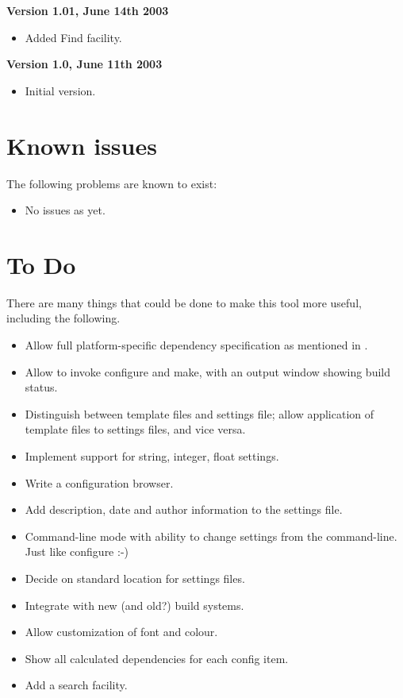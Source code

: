 {\bf Version 1.01, June 14th 2003}

\begin{itemize}\itemsep=10pt
\item Added Find facility.
\end{itemize}

{\bf Version 1.0, June 11th 2003}

\begin{itemize}\itemsep=10pt
\item Initial version.
\end{itemize}

\section{Known issues}\label{knownissues}

The following problems are known to exist:

\begin{itemize}\itemsep=10pt
\item No issues as yet.
\end{itemize}

\section{To Do}\label{todo}

There are many things that could be done to make
this tool more useful, including the following.

\begin{itemize}\itemsep=10pt
\item Allow full platform-specific dependency specification
as mentioned in .
\item Allow \ctshortname to invoke configure and make, with an output
window showing build status.
\item Distinguish between template files and settings file; allow
application of template files to settings files, and vice versa.
\item Implement support for string, integer, float settings.
\item Write a configuration browser.
\item Add description, date and author information to the settings file.
\item Command-line mode with ability to change settings from
the command-line. Just like configure :-)
\item Decide on standard location for settings files.
\item Integrate with new (and old?) build systems.
\item Allow customization of font and colour.
\item Show all calculated dependencies for each config item.
\item Add a search facility.
\end{itemize}

